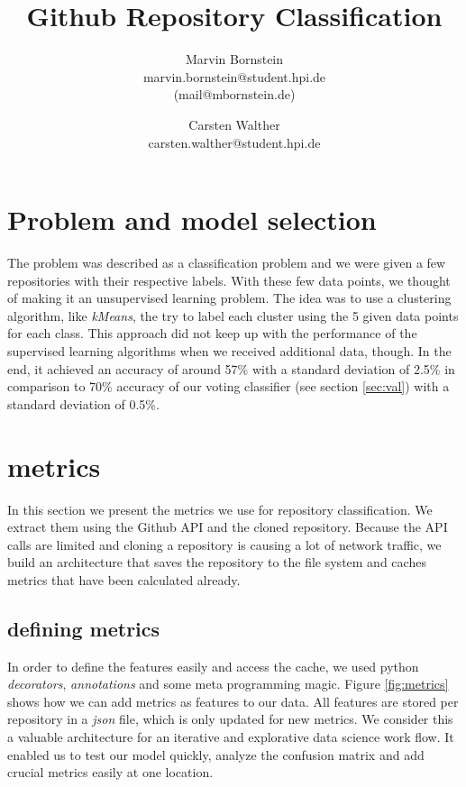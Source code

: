 \documentclass[a4paper]{scrartcl}
\title{Github Repository Classification}
\author{Marvin Bornstein\\ marvin.bornstein@student.hpi.de\\ (mail@mbornstein.de) \and Carsten Walther\\ carsten.walther@student.hpi.de}
\begin{document}
\maketitle

\section{Problem and model selection} %
\label{sec:problem_and_model_selection}

The problem was described as a classification problem and we were given a few repositories with their respective labels. With these few data points, we thought of making it an unsupervised learning problem. The idea was to use a clustering algorithm, like \emph{kMeans}, the try to label each cluster using the 5 given data points for each class. This approach did not keep up with the performance of the supervised learning algorithms when we received additional data, though. In the end, it achieved an accuracy of around 57\% with a standard deviation of 2.5\% in comparison to 70\% accuracy of our voting classifier (see section \ref{sec:val}) with a standard deviation of 0.5\%. 


\section{metrics} %
\label{sec:metrics}

In this section we present the metrics we use for repository classification. We extract them using the Github API and the cloned repository. Because the API calls are limited and cloning a repository is causing a lot of network traffic, we build an architecture that saves the repository to the file system and caches metrics that have been calculated already.

	\subsection{defining metrics} %
	\label{sub:defining_metrics}
	
	In order to define the features easily and access the cache, we used python \emph{decorators}, \emph{annotations} and some meta programming magic. Figure \ref{fig:metrics} shows how we can add metrics as features to our data. All features are stored per repository in a \emph{json} file, which is only updated for new metrics. We consider this a valuable architecture for an iterative and explorative data science work flow. It enabled us to test our model quickly, analyze the confusion matrix and add crucial metrics easily at one location.
\end{document}
